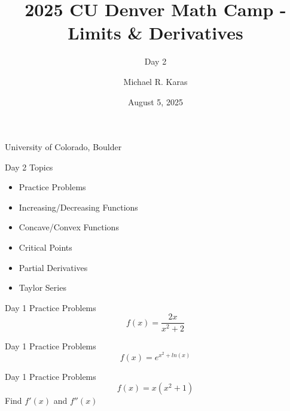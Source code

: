 \documentclass[aspectratio=169]{beamer}
\title{2025 CU Denver Math Camp - Limits \& Derivatives}
\subtitle{Day 2}
\date{August 5, 2025}
\author{Michael R. Karas}
\begin{document}
\begin{frame}
\maketitle

{\footnotesize University of Colorado, Boulder}
\end{frame}

\begin{frame}{Day 2 Topics}\label{main1}

\begin{itemize}
	\begin{itemize}
		\item Practice Problems		
		\item Increasing/Decreasing Functions
		\item Concave/Convex Functions
		\item Critical Points
		\item Partial Derivatives
		\item Taylor Series
	\end{itemize}
\end{itemize}
\end{frame}

\begin{frame}{Day 1 Practice Problems}\label{main1}
	\vspace{-4cm}
    \[
    f(x) = \frac{2x}{x^{2}+2}
    \]
\end{frame}

\begin{frame}{Day 1 Practice Problems}\label{main1}
	\vspace{-4cm}
    \[
    f(x) = e^{x^{2} + ln(x)}
    \]
\end{frame}

\begin{frame}{Day 1 Practice Problems}\label{main1}
	\vspace{-4cm}
    \[
    f(x) = x(x^{2} + 1)
    \]
    Find \( f'(x) \) and \( f''(x) \)
\end{frame}
\end{document}

